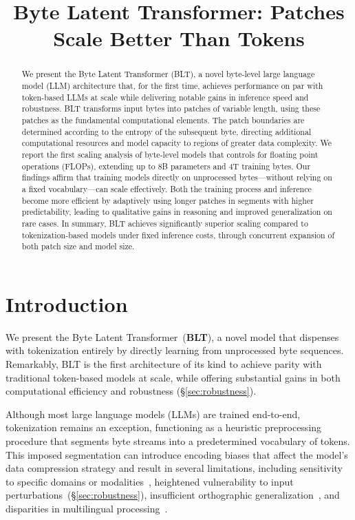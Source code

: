 \title{Byte Latent Transformer: Patches Scale Better Than Tokens}

\begin{abstract}
We present the Byte Latent Transformer ({\textsc BLT}), a novel byte-level large language model (LLM) architecture that, for the first time, achieves performance on par with token-based LLMs at scale while delivering notable gains in inference speed and robustness. {\textsc BLT} transforms input bytes into patches of variable length, using these patches as the fundamental computational elements. The patch boundaries are determined according to the entropy of the subsequent byte, directing additional computational resources and model capacity to regions of greater data complexity. We report the first scaling analysis of byte-level models that controls for floating point operations (FLOPs), extending up to 8B parameters and 4T training bytes. Our findings affirm that training models directly on unprocessed bytes—without relying on a fixed vocabulary—can scale effectively. Both the training process and inference become more efficient by adaptively using longer patches in segments with higher predictability, leading to qualitative gains in reasoning and improved generalization on rare cases. In summary, {\textsc BLT} achieves significantly superior scaling compared to tokenization-based models under fixed inference costs, through concurrent expansion of both patch size and model size.
\end{abstract}

\section{Introduction}
\label{section:intro}

We present the Byte Latent Transformer~(\textbf{BLT}), a novel model that dispenses with tokenization entirely by directly learning from unprocessed byte sequences. Remarkably, BLT is the first architecture of its kind to achieve parity with traditional token-based models at scale, while offering substantial gains in both computational efficiency and robustness (\S\ref{sec:robustness}). 

Although most large language models (LLMs) are trained end-to-end, tokenization remains an exception, functioning as a heuristic preprocessing procedure that segments byte streams into a predetermined vocabulary of tokens. This imposed segmentation can introduce encoding biases that affect the model's data compression strategy and result in several limitations, including sensitivity to specific domains or modalities~\citep{dagangetting}, heightened vulnerability to input perturbations~(\S\ref{sec:robustness}), insufficient orthographic generalization~\citep{edman2024cute}, and disparities in multilingual processing~\citep{liang2023xlm,petrov2024language,limisiewicz2024myte}.

